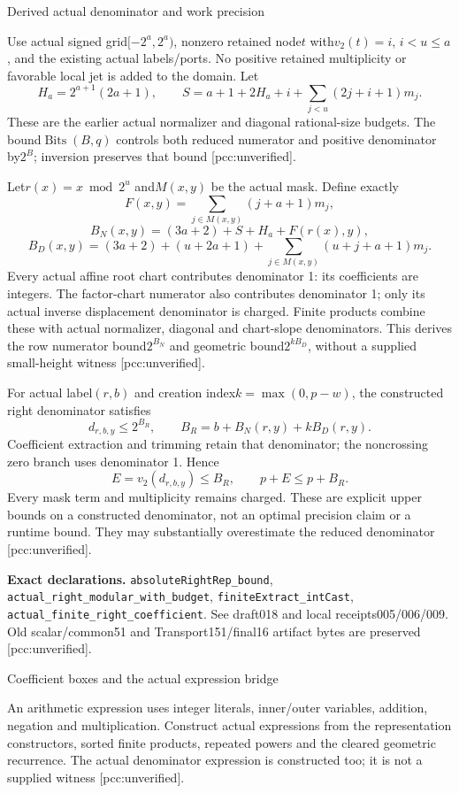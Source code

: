 \documentclass[10pt]{article}
\begin{document}
\newpage
\begin{center}{\Large Derived actual denominator and work precision}\end{center}
Use actual signed grid$[-2^a,2^a)$, nonzero retained node$t$ with$v_2(t)=i$,
$i<u\le a$, and the existing actual labels/ports. No positive retained
multiplicity or favorable local jet is added to the domain. Let
\[
 H_a=2^{a+1}(2a+1),\qquad
 S=a+1+2H_a+i+\sum_{j<u}(2j+i+1)m_j.
\]
These are the earlier actual normalizer and diagonal rational-size budgets.
The bound$\operatorname{Bits}(B,q)$ controls both reduced numerator and
positive denominator by$2^B$; inversion preserves that bound
[pcc:unverified].

Let$r(x)=x\bmod2^u$ and$M(x,y)$ be the actual mask. Define exactly
\[
 F(x,y)=\sum_{j\in M(x,y)}(j+a+1)m_j,
\]
\[
 B_N(x,y)=(3a+2)+S+H_a+F(r(x),y),
\]
\[
 B_D(x,y)=(3a+2)+(u+2a+1)
       +\sum_{j\in M(x,y)}(u+j+a+1)m_j.
\]
Every actual affine root chart contributes denominator 1: its coefficients
are integers. The factor-chart numerator also contributes denominator 1;
only its actual inverse displacement denominator is charged. Finite products
combine these with actual normalizer, diagonal and chart-slope denominators.
This derives the row numerator bound$2^{B_N}$ and geometric bound$2^{kB_D}$,
without a supplied small-height witness [pcc:unverified].

For actual label$(r,b)$ and creation index$k=\max(0,p-w)$, the constructed
right denominator satisfies
\[
 d_{r,b,y}\le2^{B_R},\qquad B_R=b+B_N(r,y)+kB_D(r,y).
\]
Coefficient extraction and trimming retain that denominator; the noncrossing
zero branch uses denominator 1. Hence
\[
 E=v_2(d_{r,b,y})\le B_R,\qquad p+E\le p+B_R.
\]
Every mask term and multiplicity remains charged. These are explicit upper
bounds on a constructed denominator, not an optimal precision claim or a
runtime bound. They may substantially overestimate the reduced denominator
[pcc:unverified].

\textbf{Exact declarations.} \texttt{absoluteRightRep\_bound},
\texttt{actual\_right\_modular\_with\_budget},
\texttt{finiteExtract\_intCast},
\texttt{actual\_finite\_right\_coefficient}.
See draft018 and local receipts005/006/009. Old scalar/common51 and
Transport151/final16 artifact bytes are preserved [pcc:unverified].

\newpage
\begin{center}{\Large Coefficient boxes and the actual expression bridge}\end{center}
An arithmetic expression uses integer literals, inner/outer variables,
addition, negation and multiplication. Construct actual expressions from
the representation constructors, sorted finite products, repeated powers
and the cleared geometric recurrence. The actual denominator expression is
constructed too; it is not a supplied witness [pcc:unverified].
\end{document}

